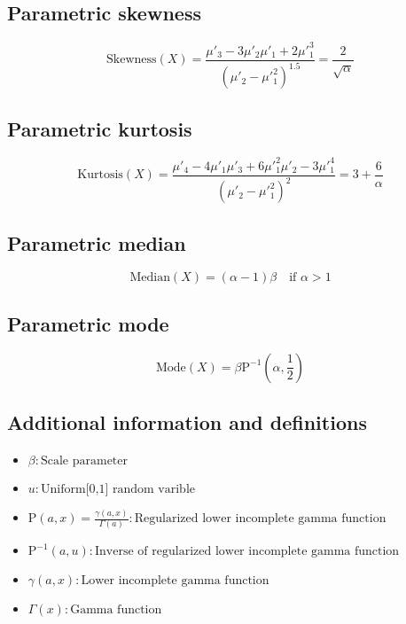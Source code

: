 \documentclass{article}
\begin{document}
\subsection{Parametric skewness}
\begin{equation*} \mathrm{Skewness}(X)=\frac{\mu'_{3}-3\mu'_{2}\mu'_{1}+2\mu'^{3}_{1}}{(\mu'_{2}-\mu'^{2}_{1})^{1.5}}=\frac{2}{\sqrt{\alpha}} \end{equation*}
\subsection{Parametric kurtosis}
\begin{equation*} \mathrm{Kurtosis}(X)=\frac{\mu'_{4}-4\mu'_{1}\mu'_{3}+6\mu'^{2}_{1}\mu'_{2}-3\mu'^{4}_{1}}{(\mu'_{2}-\mu'^{2}_{1})^{2}}=3+\frac{6}{\alpha} \end{equation*}
\subsection{Parametric median}
\begin{equation*} \mathrm{Median}(X)=(\alpha-1)\beta \quad \text{if }\alpha>1 \end{equation*}
\subsection{Parametric mode}
\begin{equation*} \mathrm{Mode}(X)=\beta \text{P}^{-1}\left(\alpha,\frac{1}{2}\right) \end{equation*}
\subsection{Additional information and definitions}
\begin{itemize}
    \item $ \beta:\text{Scale parameter} $
    \item $ u:\text{Uniform[0,1] random varible} $
    \item $ \text{P}\left(a,x\right)=\frac{\gamma(a,x)}{\Gamma(a)}:\text{Regularized lower incomplete gamma function} $
    \item $ \text{P}^{-1}\left(a,u\right):\text{Inverse of regularized lower incomplete gamma function} $
    \item $ \gamma\left(a,x\right):\text{Lower incomplete gamma function} $
    \item $ \Gamma\left(x\right):\text{Gamma function} $
\end{itemize}
\end{document}
